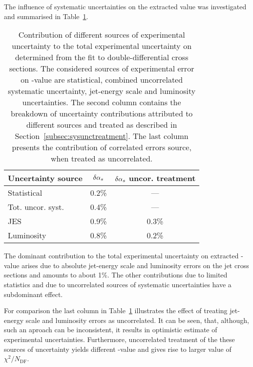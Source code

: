The influence of systematic uncertainties on the extracted \asz value was investigated and summarised in Table~\ref{tab:asuncbreakdown}.
\begin{table}
\centering
\begin{tabular}{|l|c|c|}
 \hline
 Uncertainty source & $\delta\mbox{$\alpha_{s}$}$ & $\delta\mbox{$\alpha_{s}$}$ uncor. treatment\\
 \hline\hline
 Statistical       & 0.2\% & ---     \\
 Tot. uncor. syst. & 0.4\% & ---     \\
 JES               & 0.9\% & 0.3\%   \\
 Luminosity        & 0.8\% & 0.2\%   \\
 \hline
\end{tabular}
\caption{Contribution of different sources of experimental uncertainty to the total experimental uncertainty on \asz determined from the fit to double-differential cross sections. The considered sources of experimental error on \asz-value are statistical, combined uncorrelated systematic uncertainty, jet-energy scale and luminosity uncertainties. The second column contains the breakdown of uncertainty contributions attributed to different sources and treated as described in Section~\ref{subsec:sysunctreatment}. The last column presents the contribution of correlated errors source, when treated as uncorrelated.}
\label{tab:asuncbreakdown}
\end{table}

The dominant contribution to the total experimental uncertainty on extracted \as-value arises due to absolute jet-energy scale and luminosity errors on the jet cross sections and amounts to about 1\%. The other contributions due to limited statistics and due to uncorrelated sources of systematic uncertainties have a subdominant effect. 

For comparison the last column in Table~\ref{tab:asuncbreakdown} illustrates the effect of treating jet-energy scale and luminosity errors as uncorrelated. It can be seen, that, although, such an aproach can be inconsistent, it results in optimistic estimate of experimental uncertainties. Furthermore, uncorrelated treatment of the these sources of uncertainty yields different \as-value and gives rise to larger value of $\chi^2/N_\text{DF}$. 